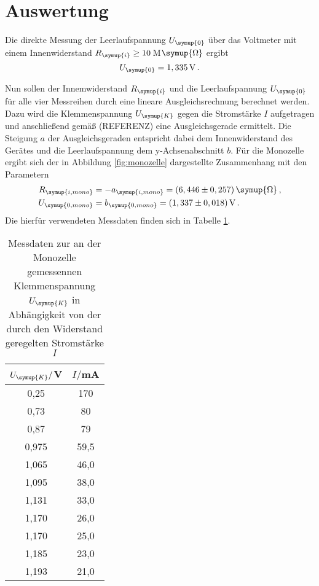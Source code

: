 \section{Auswertung}
\label{sec:Auswertung}

Die direkte Messung der Leerlaufspannung $U_{\symup{0}}$ über das Voltmeter
mit einem Innenwiderstand $R_{\symup{i}}\geq10$\,M$\symup{\Omega}$ ergibt
\begin{equation}
  U_{\symup{0}}=1,335\,\text{V}\,.
\end{equation}


Nun sollen der Innemwiderstand $R_{\symup{i}}$ und die Leerlaufspannung $U_{\symup{0}}$
für alle vier Messreihen durch eine lineare Ausgleichsrechnung berechnet werden.
Dazu wird die Klemmenspannung $U_{\symup{K}}$ gegen die Stromstärke $I$ aufgetragen
und anschließend gemäß (REFERENZ) eine Ausgleichsgerade ermittelt.
Die Steigung $a$ der Ausgleichsgeraden entspricht dabei dem Innenwiderstand des
Gerätes und die Leerlaufspannung dem y-Achsenabschnitt $b$. Für die Monozelle
ergibt sich der in Abbildung \ref{fig:monozelle} dargestellte Zusammenhang mit den
Parametern
\begin{align}
  R_{\symup{i,mono}}&=-a_{\symup{i,mono}}=(6,446\pm0,257)\,\symup{\Omega} \,, \\
  U_{\symup{0,mono}}&=b_{\symup{0,mono}}=(1,337\pm0,018)\,\text{V}\,.
\end{align}
Die hierfür verwendeten Messdaten finden sich in Tabelle \ref{tab:monozelle}.

\begin{table}
  \centering
  \caption{Messdaten zur an der Monozelle gemessennen Klemmenspannung $U_{\symup{K}}$
  in Abhängigkeit von der durch den Widerstand geregelten Stromstärke $I$}
  \label{tab:monozelle}
  \begin{tabular}{c c}
    \toprule
    $U_{\symup{K}}/$V & $I/$mA\\
    \midrule
    0,25	&  170\\
    0,73	&  80\\
    0,87	&  79\\
    0,975	& 59,5\\
    1,065	& 46,0\\
    1,095	& 38,0\\
    1,131	& 33,0\\
    1,170	& 26,0\\
    1,170	& 25,0\\
    1,185	& 23,0\\
    1,193	& 21,0\\
    \bottomrule
  \end{tabular}
\end{table}

